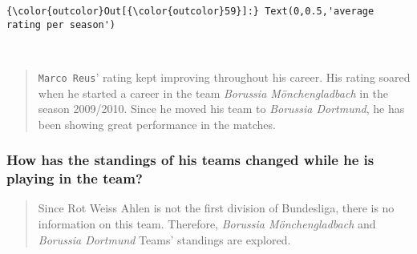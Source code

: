 \documentclass[11pt]{article}
\begin{document}
\begin{Verbatim}[commandchars=\\\{\}]
{\color{outcolor}Out[{\color{outcolor}59}]:} Text(0,0.5,'average rating per season')
\end{Verbatim}
            
    \begin{center}
    \end{center}
    { \hspace*{\fill} \\}
    
    \begin{quote}
\texttt{Marco\ Reus}' rating kept improving throughout his career. His
rating soared when he started a career in the team \emph{Borussia
Mönchengladbach} in the season 2009/2010. Since he moved his team to
\emph{Borussia Dortmund}, he has been showing great performance in the
matches.
\end{quote}

    \subsubsection{How has the standings of his teams changed while he is
playing in the
team?}\label{how-has-the-standings-of-his-teams-changed-while-he-is-playing-in-the-team}

    \begin{quote}
Since Rot Weiss Ahlen is not the first division of Bundesliga, there is
no information on this team. Therefore, \emph{Borussia Mönchengladbach}
and \emph{Borussia Dortmund} Teams' standings are explored.
\end{quote}
\end{document}

